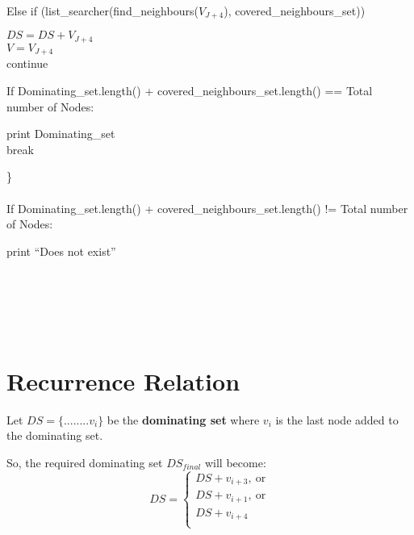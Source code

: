 \documentclass[letterpaper, 11pt]{article}
\begin{document}
\begin{tcolorbox}
\begin{adjustwidth}{0.5cm}{}
	    Else if (list\_searcher(find\_neighbours($V_{J+4}$), covered\_neighbours\_set))
	    \begin{adjustwidth}{0.5cm}{}
		    $DS = DS + V_{J+4}$\\
		    $V = V_{J+4}$\\
            continue  \\
            \end{adjustwidth}



	    If Dominating\_set.length() + covered\_neighbours\_set.length() == Total number of Nodes:
	    \begin{adjustwidth}{0.5cm}{}
		    print Dominating\_set\\
            break
            \end{adjustwidth}
\end{adjustwidth}
        


\}\\\\
If Dominating\_set.length() +  covered\_neighbours\_set.length() != Total number of Nodes:
 \begin{adjustwidth}{0.5cm}{}
print “Does not exist”\\
\end{adjustwidth}
    \end{tcolorbox}



\\\\\\\
\section{Recurrence Relation}
\label{sec:recurrence}
Let $DS = \{ ........ v_{i}\}$ be the \textbf{dominating set} where $v_{i}$ is the last node added to the dominating set.

So, the required dominating set $DS_{final}$ will become:
\begin{equation*}
    DS =\begin{cases}
    DS + v_{i+3},\  \text{or}\\
    DS + v_{i+1},\  \text{or}\\
    DS + v_{i+4}\\
  \end{cases}
\end{equation*}
\end{document}
